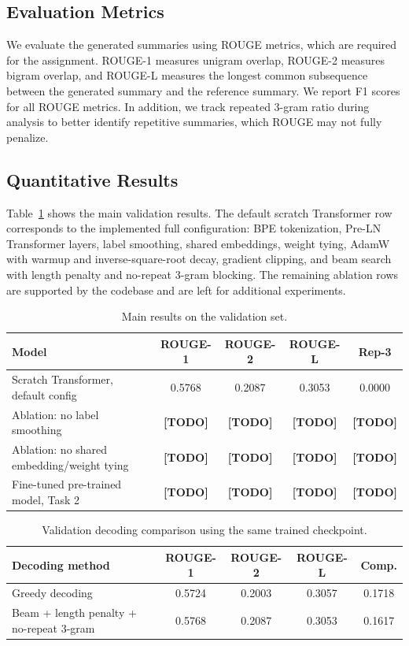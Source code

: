 \documentclass[conference]{IEEEtran}
\begin{document}
\subsection{Evaluation Metrics}
We evaluate the generated summaries using ROUGE metrics, which are required for the assignment. ROUGE-1 measures unigram overlap, ROUGE-2 measures bigram overlap, and ROUGE-L measures the longest common subsequence between the generated summary and the reference summary. We report F1 scores for all ROUGE metrics. In addition, we track repeated 3-gram ratio during analysis to better identify repetitive summaries, which ROUGE may not fully penalize.

\subsection{Quantitative Results}
Table~\ref{tab:main_results} shows the main validation results. The default scratch Transformer row corresponds to the implemented full configuration: BPE tokenization, Pre-LN Transformer layers, label smoothing, shared embeddings, weight tying, AdamW with warmup and inverse-square-root decay, gradient clipping, and beam search with length penalty and no-repeat 3-gram blocking. The remaining ablation rows are supported by the codebase and are left for additional experiments.

\begin{table}[htbp]
\centering
\caption{Main results on the validation set.}
\label{tab:main_results}
\begin{tabular}{lcccc}
\toprule
Model & ROUGE-1 & ROUGE-2 & ROUGE-L & Rep-3 \\
\midrule
Scratch Transformer, default config & 0.5768 & 0.2087 & 0.3053 & 0.0000 \\
Ablation: no label smoothing & \textbf{[TODO]} & \textbf{[TODO]} & \textbf{[TODO]} & \textbf{[TODO]} \\
Ablation: no shared embedding/weight tying & \textbf{[TODO]} & \textbf{[TODO]} & \textbf{[TODO]} & \textbf{[TODO]} \\
Fine-tuned pre-trained model, Task 2 & \textbf{[TODO]} & \textbf{[TODO]} & \textbf{[TODO]} & \textbf{[TODO]} \\
\bottomrule
\end{tabular}
\end{table}

\begin{table}[htbp]
\centering
\caption{Validation decoding comparison using the same trained checkpoint.}
\label{tab:decoding_results}
\begin{tabular}{lcccc}
\toprule
Decoding method & ROUGE-1 & ROUGE-2 & ROUGE-L & Comp. \\
\midrule
Greedy decoding & 0.5724 & 0.2003 & 0.3057 & 0.1718 \\
Beam + length penalty + no-repeat 3-gram & 0.5768 & 0.2087 & 0.3053 & 0.1617 \\
\bottomrule
\end{tabular}
\end{table}
\end{document}
